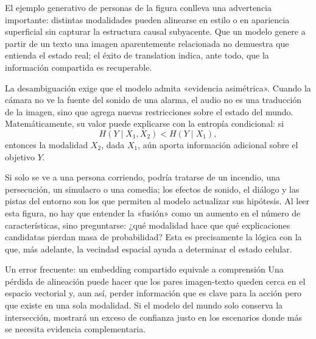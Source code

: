 
El ejemplo generativo de personas de la figura conlleva una advertencia importante: distintas modalidades pueden alinearse en estilo o en apariencia superficial sin capturar la estructura causal subyacente. Que un modelo genere a partir de un texto una imagen aparentemente relacionada no demuestra que entienda el estado real; el éxito de translation indica, ante todo, que la información compartida es recuperable.


La desambiguación exige que el modelo admita «evidencia asimétrica». Cuando la cámara no ve la fuente del sonido de una alarma, el audio no es una traducción de la imagen, sino que agrega nuevas restricciones sobre el estado del mundo. Matemáticamente, su valor puede explicarse con la entropía condicional: si
\[
H(Y\mid X_1,X_2)<H(Y\mid X_1),
\]
entonces la modalidad $X_2$, dada $X_1$, aún aporta información adicional sobre el objetivo $Y$.


Si solo se ve a una persona corriendo, podría tratarse de un incendio, una persecución, un simulacro o una comedia; los efectos de sonido, el diálogo y las pistas del entorno son los que permiten al modelo actualizar sus hipótesis. Al leer esta figura, no hay que entender la «fusión» como un aumento en el número de características, sino preguntarse: ¿qué modalidad hace que qué explicaciones candidatas pierdan masa de probabilidad? Esta es precisamente la lógica con la que, más adelante, la vecindad espacial ayuda a determinar el estado celular.


\begin{warningbox}{Un error frecuente: un embedding compartido equivale a comprensión}
Una pérdida de alineación puede hacer que los pares imagen-texto queden cerca en el espacio vectorial y, aun así, perder información que es clave para la acción pero que existe en una sola modalidad. Si el modelo del mundo solo conserva la intersección, mostrará un exceso de confianza justo en los escenarios donde más se necesita evidencia complementaria.
\end{warningbox}

